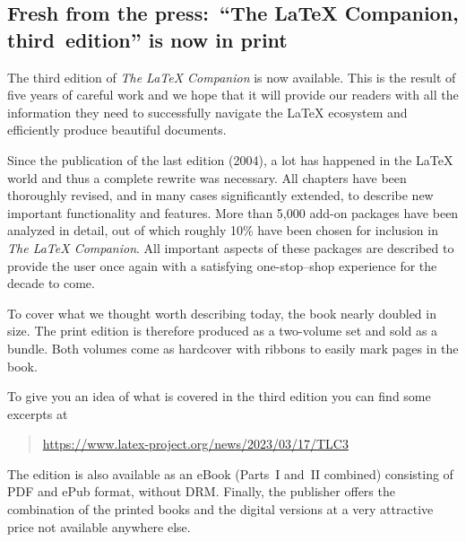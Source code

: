 \documentclass{ltnews}
\begin{document}
\subsection{Fresh from the press:\ \enquote{The \LaTeX{} Companion, third~edition} is now in print}

The third edition of \emph{The \LaTeX{} Companion} is now
available. This is the result of five years of careful work and we hope
that it will provide our readers with all the information they need to
successfully navigate the \LaTeX{} ecosystem and efficiently produce
beautiful documents.

Since the publication of the last edition (2004), a lot has happened in
the \LaTeX{} world and thus a complete rewrite was necessary.  All
chapters have been thoroughly revised, and in many cases significantly
extended, to describe new important functionality and features. More
than 5,000 add-on packages have been analyzed in detail, out of which
roughly 10\% have been chosen for inclusion in \emph{The \LaTeX{}
Companion}. All important aspects of these packages are described to
provide the user once again with a satisfying one-stop–shop experience
for the decade to come.

To cover what we thought worth describing today, the book nearly
doubled in size. The print edition is therefore produced as a
two-volume set and sold as a bundle. Both volumes come as hardcover
with ribbons to easily mark pages in the book.

To give you an idea of what is covered in the third edition you can
find some excerpts at
\begin{quote}
\url{https://www.latex-project.org/news/2023/03/17/TLC3}
\end{quote}

The edition is also available as an eBook (Parts~I and~II combined)
consisting of PDF and ePub format, without DRM\@. Finally, the publisher
offers the combination of the printed books and the digital versions at
a very attractive price not available anywhere else.




\end{document}
